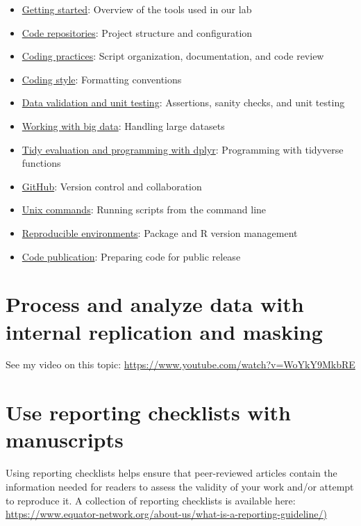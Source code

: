 \documentclass[
]{book}
\providecommand{\tightlist}{%
  \setlength{\itemsep}{0pt}\setlength{\parskip}{0pt}}
\begin{document}
\begin{itemize}
\tightlist
\item
  \href{getting-started.html}{Getting started}: Overview of the tools used in our lab
\item
  \href{code-repositories.html}{Code repositories}: Project structure and configuration
\item
  \href{coding-practices.html}{Coding practices}: Script organization, documentation, and code review
\item
  \href{coding-style.html}{Coding style}: Formatting conventions
\item
  \href{data-validation-and-unit-testing.html}{Data validation and unit testing}: Assertions, sanity checks, and unit testing
\item
  \href{working-with-big-data.html}{Working with big data}: Handling large datasets
\item
  \href{tidy-evaluation-and-programming-with-dplyr.html}{Tidy evaluation and programming with dplyr}: Programming with tidyverse functions
\item
  \href{github.html}{GitHub}: Version control and collaboration
\item
  \href{unix.html}{Unix commands}: Running scripts from the command line
\item
  \href{reproducible-environments.html}{Reproducible environments}: Package and R version management
\item
  \href{code-publication.html}{Code publication}: Preparing code for public release
\end{itemize}

\section{Process and analyze data with internal replication and masking}\label{process-and-analyze-data-with-internal-replication-and-masking}

See my video on this topic: \url{https://www.youtube.com/watch?v=WoYkY9MkbRE}

\section{Use reporting checklists with manuscripts}\label{use-reporting-checklists-with-manuscripts}

Using reporting checklists helps ensure that peer-reviewed articles contain the information needed for readers to assess the validity of your work and/or attempt to reproduce it. A collection of reporting checklists is available here: \href{https://www.equator-network.org/about-us/what-is-a-reporting-guideline/}{https://www.equator-network.org/about-us/what-is-a-reporting-guideline/)}
\end{document}
